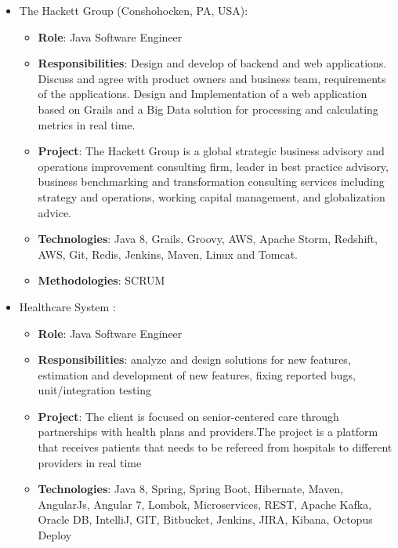 \documentclass[11pt,a4paper,sans]{moderncv}        %
\begin{document}
\vspace{10mm}

  {
    \begin{itemize}
      \item The Hackett Group (Conshohocken, PA, USA):
        \begin{itemize}
          \item \textbf{Role}: Java Software Engineer
          \item \textbf{Responsibilities}: Design and develop of backend and web applications.
		Discuss and agree with product owners and business team, requirements of the applications. Design and Implementation of a web application based on Grails and a Big Data solution for processing and calculating metrics in real time.
          \item \textbf{Project}: The Hackett Group is a global strategic business advisory and operations improvement consulting firm, leader in best practice advisory, business benchmarking and transformation consulting services including strategy and operations, working capital management, and globalization advice.
          \item \textbf{Technologies}: Java 8, Grails, Groovy, AWS, Apache Storm, Redshift, AWS, Git, Redis, Jenkins, Maven, Linux and Tomcat.
          \item \textbf{Methodologies}: SCRUM
        \end{itemize}
    \end{itemize}
  }

\vspace{10mm}

  {
    \begin{itemize}
      \item Healthcare System :
        \begin{itemize}
          \item \textbf{Role}: Java Software Engineer 
          \item \textbf{Responsibilities}: analyze and design solutions for new features, estimation and development of new features, fixing reported bugs, unit/integration testing
          \item \textbf{Project}: The client is focused on senior-centered care through partnerships with health plans and providers.The project is a platform that receives patients that needs to be refereed from hospitals to different providers in real time
          \item \textbf{Technologies}: Java 8, Spring, Spring Boot, Hibernate, Maven, AngularJs, Angular 7, Lombok, Microservices, REST, Apache Kafka, Oracle DB, IntelliJ, GIT, Bitbucket, Jenkins, JIRA, Kibana, Octopus Deploy
        \end{itemize}
    \end{itemize}
  }
\end{document}
